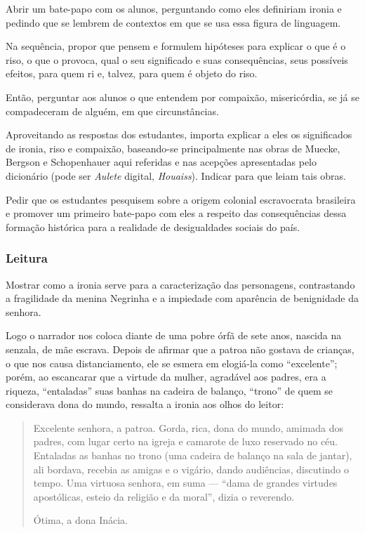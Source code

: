 \documentclass[11pt]{extarticle}
\begin{document}
Abrir um bate-papo com os alunos, perguntando como eles definiriam
ironia e pedindo que se lembrem de contextos em que se usa essa figura
de linguagem.

Na sequência, propor que pensem e formulem hipóteses para explicar o que
é o riso, o que o provoca, qual o seu significado e suas consequências,
seus possíveis efeitos, para quem ri e, talvez, para quem é objeto do
riso.

Então, perguntar aos alunos o que entendem por compaixão, misericórdia,
se já se compadeceram de alguém, em que circunstâncias.

Aproveitando as respostas dos estudantes, importa explicar a eles os
significados de ironia, riso e compaixão, baseando-se principalmente nas
obras de Muecke, Bergson e Schopenhauer aqui referidas e nas acepções
apresentadas pelo dicionário (pode ser \emph{Aulete} digital,
\emph{Houaiss}). Indicar para que leiam tais obras.

Pedir que os estudantes pesquisem sobre a origem colonial escravocrata
brasileira e promover um primeiro bate-papo com eles a respeito das
consequências dessa formação histórica para a realidade de desigualdades
sociais do país.

\subsubsection{Leitura}

Mostrar como a ironia serve para a caracterização das personagens,
contrastando a fragilidade da menina Negrinha e a impiedade com
aparência de benignidade da senhora.

Logo o narrador nos coloca diante de uma pobre órfã de sete anos,
nascida na senzala, de mãe escrava. Depois de afirmar que a patroa não
gostava de crianças, o que nos causa distanciamento, ele se esmera em
elogiá-la como ``excelente''; porém, ao escancarar que a virtude da
mulher, agradável aos padres, era a riqueza, ``entaladas'' suas banhas
na cadeira de balanço, ``trono'' de quem se considerava dona do mundo,
ressalta a ironia aos olhos do leitor:

\begin{quote}
Excelente senhora, a patroa. Gorda, rica, dona do mundo, amimada dos
padres, com lugar certo na igreja e camarote de luxo reservado no céu.
Entaladas as banhas no trono (uma cadeira de balanço na sala de jantar),
ali bordava, recebia as amigas e o vigário, dando audiências, discutindo
o tempo. Uma virtuosa senhora, em suma --- ``dama de grandes virtudes
apostólicas, esteio da religião e da moral'', dizia o reverendo.

Ótima, a dona Inácia.
\end{quote}
\end{document}
